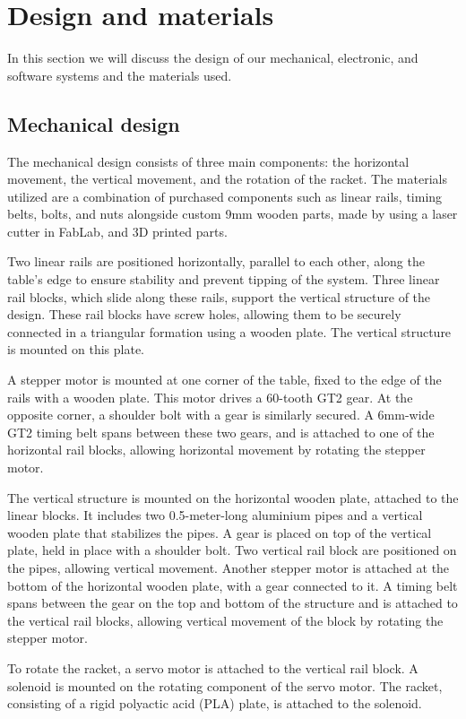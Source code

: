 \chapter{Design and materials}
In this section we will discuss the design of our mechanical, electronic, and software systems and the materials used.

\section{Mechanical design}
The mechanical design consists of three main components: the horizontal movement,  the vertical movement,  and the rotation of the racket. 
The materials utilized are a combination of purchased components such as linear rails, timing belts, bolts, and nuts alongside custom 9mm wooden parts, made by using a laser cutter in FabLab, and 3D printed parts.

Two linear rails are positioned horizontally, parallel to each other, along the table's edge to ensure stability and prevent tipping of the system. Three linear rail blocks, which slide along these rails, support the vertical structure of the design. These rail blocks have screw holes, allowing them to be securely connected in a triangular formation using a wooden plate. The vertical structure is mounted on this plate.

A stepper motor is mounted at one corner of the table, fixed to the edge of the rails with a wooden plate. This motor drives a 60-tooth GT2 gear. At the opposite corner, a shoulder bolt with a gear is similarly secured. A 6mm-wide GT2 timing belt spans between these two gears, and is attached to one of the horizontal rail blocks, allowing horizontal movement by rotating the stepper motor.

The vertical structure is mounted on the horizontal wooden plate, attached to the linear blocks. It includes two 0.5-meter-long aluminium pipes and a vertical wooden plate that stabilizes the pipes. A gear is placed on top of the vertical plate, held in place with a shoulder bolt. Two vertical rail block are positioned on the pipes, allowing vertical movement. Another stepper motor is attached at the bottom of the horizontal wooden plate, with a gear connected to it. A timing belt spans between the gear on the top and bottom of the structure and is attached to the vertical rail blocks, allowing vertical movement of the block by rotating the stepper motor.

To rotate the racket, a servo motor is attached to the vertical rail block. A solenoid is mounted on the rotating component of the servo motor. The racket, consisting of a rigid polyactic acid (PLA) plate, is attached to the solenoid.


